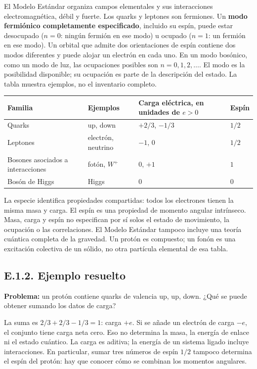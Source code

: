 \documentclass[
  spanish,
  10pt,
  a4paper,
]{article}
\newcounter{none} %
\begin{document}
El Modelo Estándar organiza campos elementales y sus interacciones
electromagnética, débil y fuerte. Los quarks y leptones son fermiones.
Un \textbf{modo fermiónico completamente especificado}, incluido su
espín, puede estar desocupado (\(n=0\): ningún fermión en ese modo) u
ocupado (\(n=1\): un fermión en ese modo). Un orbital que admite dos
orientaciones de espín contiene dos modos diferentes y puede alojar un
electrón en cada uno. En un modo bosónico, como un modo de luz, las
ocupaciones posibles son \(n=0,1,2,\ldots\). El modo es la posibilidad
disponible; su ocupación es parte de la descripción del estado. La tabla
muestra ejemplos, no el inventario completo.


{\def\LTcaptype{none} %
\begin{longtable}[]{@{}llll@{}}
\toprule\noalign{}
Familia & Ejemplos & Carga eléctrica, en unidades de \(e>0\) & Espín \\
\midrule\noalign{}
\endhead
\bottomrule\noalign{}
\endlastfoot
Quarks & up, down & \(+2/3\), \(-1/3\) & \(1/2\) \\
Leptones & electrón, neutrino & \(-1\), \(0\) & \(1/2\) \\
Bosones asociados a interacciones & fotón, \(W^+\) & \(0\), \(+1\) &
\(1\) \\
Bosón de Higgs & Higgs & \(0\) & \(0\) \\
\end{longtable}
}

La especie identifica propiedades compartidas: todos los electrones
tienen la misma masa y carga. El espín es una propiedad de momento
angular intrínseco. Masa, carga y espín no especifican por sí solos el
estado de movimiento, la ocupación o las correlaciones. El Modelo
Estándar tampoco incluye una teoría cuántica completa de la gravedad. Un
protón es compuesto; un fonón es una excitación colectiva de un sólido,
no otra partícula elemental de esa tabla.

\subsection{E.1.2. Ejemplo resuelto}\label{e.1.2.-ejemplo-resuelto}

\textbf{Problema:} un protón contiene quarks de valencia up, up, down.
¿Qué se puede obtener sumando los datos de carga?

La suma es \(2/3+2/3-1/3=1\): carga \(+e\). Si se añade un electrón de
carga \(-e\), el conjunto tiene carga neta cero. Eso no determina la
masa, la energía de enlace ni el estado cuántico. La carga es aditiva;
la energía de un sistema ligado incluye interacciones. En particular,
sumar tres números de espín \(1/2\) tampoco determina el espín del
protón: hay que conocer cómo se combinan los momentos angulares.
\end{document}
